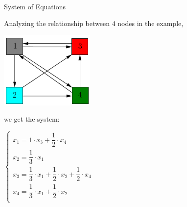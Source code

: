 \documentclass{beamer}
\begin{document}

\begin{frame}[t]{System of Equations}
    \begin{outline}
        \1 Analyzing the relationship between 4 nodes in the example, 
        
        \begin{center}
            \includegraphics[width=0.35\textwidth]{unweighted.png}    
        \end{center}

        we get the system:
    
        \begin{center}
            $\begin{cases}
                x_1 = 1 \cdot x_3 + \dfrac{1}{2}\cdot x_4&\\[6pt]
                x_2 = \dfrac{1}{3}\cdot x_1&\\[6pt]
                x_3 = \dfrac{1}{3}\cdot x_1 + \dfrac{1}{2}\cdot x_2 + \dfrac{1}{2}\cdot x_4&\\[6pt]
                x_4 = \dfrac{1}{3}\cdot x_1 + \dfrac{1}{2}\cdot x_2&\\[6pt]
            \end{cases}$
        \end{center}
    \end{outline}
\end{frame}
\end{document}
